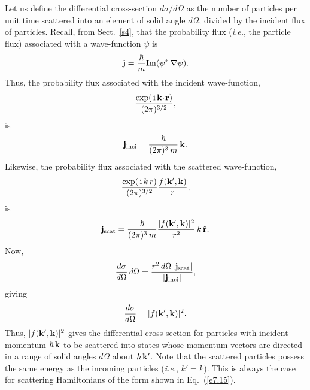 Let us define the differential cross-section $d\sigma/d\Omega$ as
the number of particles per unit time scattered into an element of
solid angle $d\Omega$, divided by the incident flux of particles. 
Recall, from Sect.~\ref{s4}, that the probability flux 
({\em i.e.}, the particle flux) associated with a
wave-function $\psi$ is
\begin{equation}
{\bf j} = \frac{\hbar}{m} {\rm Im}(\psi^\ast\, \nabla \psi).
\end{equation}
Thus, the probability flux associated with the incident wave-function,
\begin{equation}
\frac{ \exp(\,{\rm i} \,{\bf k}\!\cdot\!{\bf r})}{(2\pi)^{3/2}},
\end{equation}
is
\begin{equation}
{\bf j}_{\rm inci} = \frac{\hbar}{(2\pi)^{3}\,m} \,{\bf k}.
\end{equation}
Likewise, the probability flux associated with the scattered wave-function,
\begin{equation}
\frac{ \exp(\,{\rm i} \,k\,r)}{(2\pi)^{3/2}}\frac{
 f({\bf k}', {\bf k})}{r},
\end{equation}
 is
\begin{equation}
{\bf j}_{\rm scat}=\frac{\hbar}{(2\pi)^{3}\,m}
\frac{|f( {\bf k}', {\bf k})|^2}{r^2} \, k\, \hat{\bf r}.
\end{equation}
Now,
\begin{equation}
\frac{d\sigma}{d \Omega} \,d\Omega  = 
\frac{ r^2\,d\Omega \, |{\bf j}_{\rm scat}|}{|{\bf j}_{\rm inci}|},
\end{equation}
giving
\begin{equation}\label{e7.33}
\frac{d\sigma}{d \Omega} = |f({\bf k}', {\bf k})|^2.
\end{equation}
Thus, $|f({\bf k}', {\bf k})|^2$ gives the differential cross-section for particles with incident momentum $\hbar\,{ \bf k}$ to be scattered
into states whose momentum vectors are directed in a range of solid angles
$d\Omega$ about $\hbar\,{ \bf k}'$. Note that the scattered particles possess
the same energy as the incoming particles ({\em i.e.}, $k'=k$). This is always
the case for scattering Hamiltonians of the form shown in Eq.~(\ref{e7.15}). 

